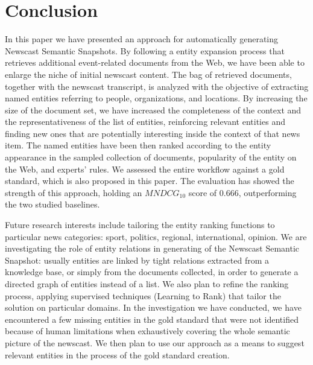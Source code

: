 \documentclass{llncs}
\begin{document}

\section{Conclusion}
\label{sec:Conclusion}
In this paper we have presented an approach for automatically generating Newscast Semantic Snapshots. By following a entity expansion process that retrieves additional event-related documents from the Web, we have been able to enlarge the niche of initial newscast content. The bag of retrieved documents, together with the newscast transcript, is analyzed with the objective of extracting named entities referring to people, organizations, and locations. By increasing the size of the document set, we have increased the completeness of the context and the representativeness of the list of entities, reinforcing relevant entities and finding new ones that are potentially interesting inside the context of that news item. The named entities have been then ranked according to the entity appearance in the sampled collection of documents, popularity of the entity on the Web, and experts' rules. We assessed the entire workflow against a gold standard, which is also proposed in this paper. The evaluation has showed the strength of this approach, holding an $MNDCG_{10}$ score of 0.666, outperforming the two studied baselines.


Future research interests include tailoring the entity ranking functions to particular news categories: sport, politics, regional, international, opinion. We are investigating the role of entity relations in generating of the Newscast Semantic Snapshot: usually entities are linked by tight relations extracted from a knowledge base, or simply from the documents collected, in order to generate a directed graph of entities instead of a list. We also plan to refine the ranking process, applying supervised techniques (Learning to Rank) that tailor the solution on particular domains. 
In the investigation we have conducted, we have encountered a few missing entities in the gold standard that were not identified because of human limitations when exhaustively covering the whole semantic picture of the newscast. We then plan to use our approach as a means to suggest relevant entities in the process of the gold standard creation.
\end{document}
